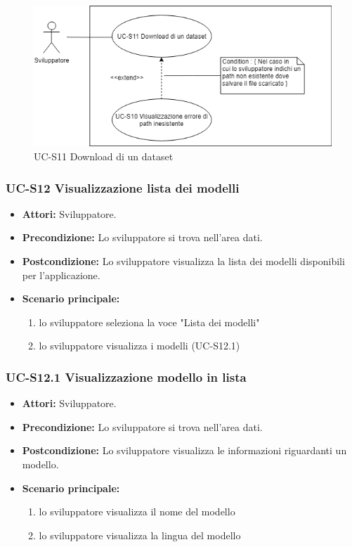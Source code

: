 \begin{figure}[h]
		\centering
		\includegraphics[scale=0.7]{images/UC-S11.png}
		\caption{UC-S11 Download di un dataset}
	\end{figure}		
		
	\subsubsection{UC-S12 Visualizzazione lista dei modelli}
		\begin{itemize}
			\item \textbf{Attori:} Sviluppatore.
			\item \textbf{Precondizione:} Lo sviluppatore si trova nell'area dati.
			\item \textbf{Postcondizione:} Lo sviluppatore visualizza la lista dei modelli disponibili per l'applicazione.
			\item \textbf{Scenario principale:}
			\begin{enumerate}
					\item lo sviluppatore seleziona la voce "Lista dei modelli"
					\item lo sviluppatore visualizza i modelli (UC-S12.1)
				\end{enumerate}
		\end{itemize}	
		
\subsubsection{UC-S12.1 Visualizzazione modello in lista}
		\begin{itemize}
			\item \textbf{Attori:} Sviluppatore.
			\item \textbf{Precondizione:} Lo sviluppatore si trova nell'area dati.
			\item \textbf{Postcondizione:} Lo sviluppatore visualizza le informazioni riguardanti un modello.
			\item \textbf{Scenario principale:}
			\begin{enumerate}
					\item lo sviluppatore visualizza il nome del modello
					\item lo sviluppatore visualizza la lingua del modello
				\end{enumerate}
		\end{itemize}			
	
